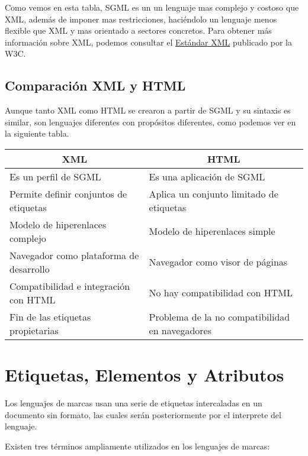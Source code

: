 Como vemos en esta tabla, SGML es un un lenguaje mas complejo y costoso que XML, además de imponer mas restricciones, haciéndolo un lenguaje menos flexible que XML y mas orientado a sectores concretos. Para obtener más información sobre XML, podemos consultar el \href{https://www.w3.org/TR/REC-xml/}{Estándar XML} publicado por la W3C.

\subsection{Comparación XML y HTML}
Aunque tanto XML como HTML se crearon a partir de SGML y su sintaxis es similar, son lenguajes diferentes con propósitos diferentes, como podemos ver en la siguiente tabla.

 \begin{table}[h]
    \centering
    {\renewcommand{\arraystretch}{1.5}
        \begin{tabular}[c]{ |l|l| }
            \hline
            \multicolumn{1}{|c|}{\textbf{XML}} & \multicolumn{1}{|c|}{\textbf{HTML}} \\ \hline
            Es un perfil de SGML & Es una aplicación de SGML \\ \hline
            Permite definir conjuntos de etiquetas & Aplica un conjunto limitado de etiquetas \\ \hline
            Modelo de hiperenlaces complejo & Modelo de hiperenlaces simple \\ \hline
            Navegador como plataforma de desarrollo & Navegador como visor de páginas \\ \hline
            Compatibilidad e integración con HTML & No hay compatibilidad con HTML \\ \hline
            Fin de las etiquetas propietarias & Problema de la no compatibilidad en navegadores \\ \hline
    \end{tabular}}
\end{table}

\section{Etiquetas, Elementos y Atributos}
Los lenguajes de marcas usan una serie de etiquetas intercaladas en un documento sin formato, las cuales serán posteriormente por el interprete del lenguaje.

Existen tres términos ampliamente utilizados en los lenguajes de marcas:


